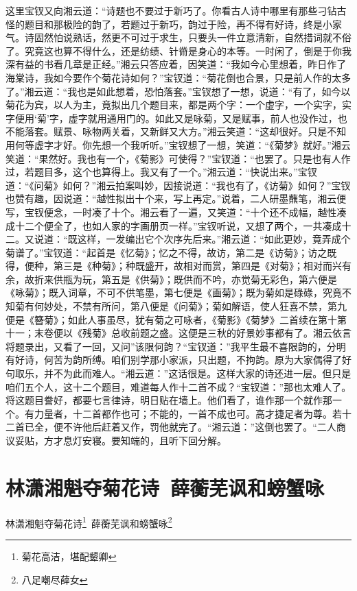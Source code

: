 \documentclass[12pt,oneside]{book}
\begin{document}
这里宝钗又向湘云道：“诗题也不要过于新巧了。你看古人诗中哪里有那些刁钻古怪的题目和那极险的韵了，若题过于新巧，韵过于险，再不得有好诗，终是小家气。诗固然怕说熟话，然更不可过于求生，只要头一件立意清新，自然措词就不俗了。究竟这也算不得什么，还是纺绩、针黹是身心的本等。一时闲了，倒是于你我深有益的书看几章是正经。”湘云只答应着，因笑道：“我如今心里想着，昨日作了海棠诗，我如今要作个菊花诗如何？”宝钗道：“菊花倒也合景，只是前人作的太多了。”湘云道：“我也是如此想着，恐怕落套。”宝钗想了一想，说道：“有了，如今以菊花为宾，以人为主，竟拟出几个题目来，都是两个字：一个虚字，一个实字，实字便用‘菊’字，虚字就用通用门的。如此又是咏菊，又是赋事，前人也没作过，也不能落套。赋景、咏物两关着，又新鲜又大方。”湘云笑道：“这却很好。只是不知用何等虚字才好。你先想一个我听听。”宝钗想了一想，笑道：“《菊梦》就好。”湘云笑道：“果然好。我也有一个，《菊影》可使得？”宝钗道：“也罢了。只是也有人作过，若题目多，这个也算得上。我又有了一个。”湘云道：“快说出来。”宝钗道：“《问菊》如何？”湘云拍案叫妙，因接说道：“我也有了，《访菊》如何？”宝钗也赞有趣，因说道：“越性拟出十个来，写上再定。”说着，二人研墨蘸笔，湘云便写，宝钗便念，一时凑了十个。湘云看了一遍，又笑道：“十个还不成幅，越性凑成十二个便全了，也如人家的字画册页一样。”宝钗听说，又想了两个，一共凑成十二。又说道：“既这样，一发编出它个次序先后来。”湘云道：“如此更妙，竟弄成个菊谱了。”宝钗道：“起首是《忆菊》；忆之不得，故访，第二是《访菊》；访之既得，便种，第三是《种菊》；种既盛开，故相对而赏，第四是《对菊》；相对而兴有余，故折来供瓶为玩，第五是《供菊》；既供而不吟，亦觉菊无彩色，第六便是《咏菊》；既入词章，不可不供笔墨，第七便是《画菊》；既为菊如是碌碌，究竟不知菊有何妙处，不禁有所问，第八便是《问菊》；菊如解语，使人狂喜不禁，第九便是《簪菊》；如此人事虽尽，犹有菊之可咏者，《菊影》《菊梦》二首续在第十第十一；末卷便以《残菊》总收前题之盛。这便是三秋的好景妙事都有了。湘云依言将题录出，又看了一回，又问”该限何韵？“宝钗道：”我平生最不喜限韵的，分明有好诗，何苦为韵所缚。咱们别学那小家派，只出题，不拘韵。原为大家偶得了好句取乐，并不为此而难人。“湘云道：”这话很是。这样大家的诗还进一层。但只是咱们五个人，这十二个题目，难道每人作十二首不成？“宝钗道：”那也太难人了。将这题目誊好，都要七言律诗，明日贴在墙上。他们看了，谁作那一个就作那一个。有力量者，十二首都作也可；不能的，一首不成也可。高才捷足者为尊。若十二首已全，便不许他后赶着又作，罚他就完了。“湘云道：”这倒也罢了。“二人商议妥贴，方才息灯安寝。要知端的，且听下回分解。


 
\chapter{林潇湘魁夺菊花诗~薛蘅芜讽和螃蟹咏}
林潇湘魁夺菊花诗\footnote{菊花高洁，堪配颦卿}~薛蘅芜讽和螃蟹咏\footnote{八足嘲尽薛女}
\end{document}
